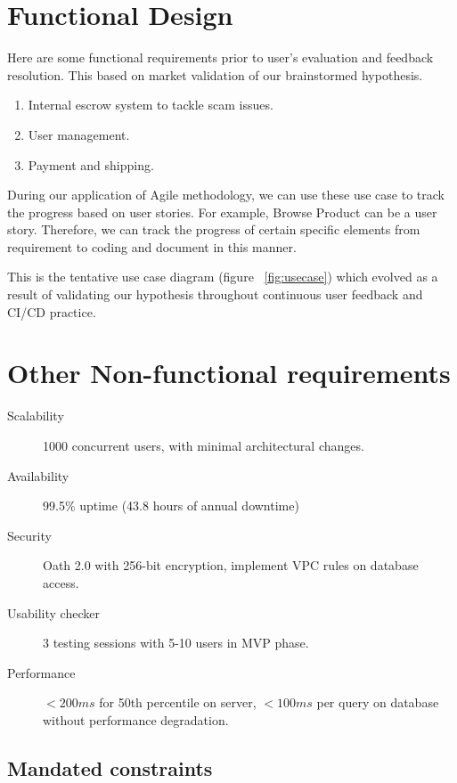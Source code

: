 \section{Functional Design}

Here are some functional requirements prior to user's evaluation and feedback resolution. This based on market validation of our brainstormed hypothesis.

\begin{enumerate}
	\item Internal escrow system to tackle scam issues.
	\item User management.
	\item Payment and shipping.
\end{enumerate}

During our application of Agile methodology, we can use these use case to track the progress based on user stories. For example, Browse Product can be a user story. Therefore, we can track the progress of certain specific elements from requirement to coding and document in this manner.


This is the tentative use case diagram (figure ~\ref{fig:usecase}) which evolved as a result of validating our hypothesis throughout continuous user feedback and CI/CD practice.

\section{Other Non-functional requirements}

\begin{description}
	\item[Scalability] 1000 concurrent users, with minimal architectural changes.
	\item[Availability] 99.5\% uptime (43.8 hours of annual downtime)
	\item[Security] Oath 2.0 with 256-bit encryption, implement VPC rules on database access.
	\item[Usability checker] 3 testing sessions with 5-10 users in MVP phase.
	\item[Performance] $< 200 ms$ for 50th percentile on server, $< 100 ms$ per query on database without performance degradation.
\end{description}

\subsection{Mandated constraints}

